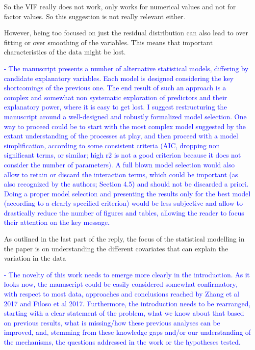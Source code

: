 \documentclass[]{elsarticle} %
\begin{document}
So the VIF really does not work, only works for numerical values and not for factor values. So this suggestion is not really relevant either.

However, being too focused on just the residual distribution can also lead to over fitting or over smoothing of the variables. This means that important characteristics of the data might be lost.

\textcolor{blue}{- The manuscript presents a number of alternative statistical models, differing by candidate explanatory variables. Each model is designed considering the key shortcomings of the previous one. The end result of such an approach is a complex and somewhat non systematic exploration of predictors and their explanatory power, where it is easy to get lost. I suggest restructuring the manuscript around a well-designed and robustly formalized model selection. One way to proceed could be to start with the most complex model suggested by the extant understanding of the processes at play, and then proceed with a model simplification, according to some consistent criteria (AIC, dropping non significant terms, or similar; high r2 is not a good criterion because it does not consider the number of parameters). A full blown model selection would also allow to retain or discard the interaction terms, which could be important (as also recognized by the authors; Section 4.5) and should not be discarded a priori. Doing a proper model selection and presenting the results only for the best model (according to a clearly specified criterion) would be less subjective and allow to drastically reduce the number of figures and tables, allowing the reader to focus their attention on the key message.}

As outlined in the last part of the reply, the focus of the statistical modelling in the paper is on understanding the different covariates that can explain the variation in the data

\textcolor{blue}{- The novelty of this work needs to emerge more clearly in the introduction. As it looks now, the manuscript could be easily considered somewhat confirmatory, with respect to most data, approaches and conclusions reached by Zhang et al 2017 and Filoso et al 2017. Furthermore, the introduction needs to be rearranged, starting with a clear statement of the problem, what we know about that based on previous results, what is missing/how these previous analyses can be improved, and, stemming from these knowledge gaps and/or our understanding of the mechanisms, the questions addressed in the work or the hypotheses tested.}
\end{document}
